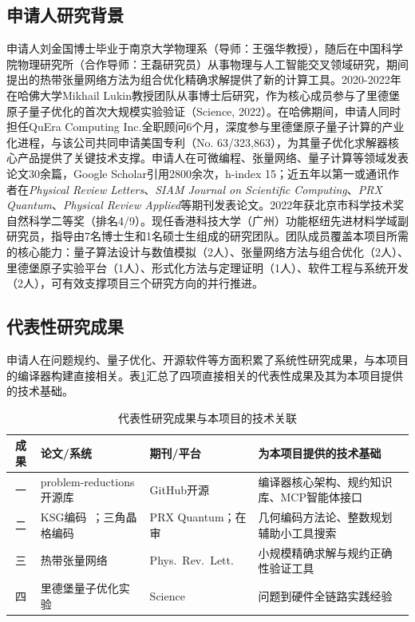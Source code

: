 
\subsection*{申请人研究背景}

申请人刘金国博士毕业于南京大学物理系（导师：王强华教授），随后在中国科学院物理研究所（合作导师：王磊研究员）从事物理与人工智能交叉领域研究，期间提出的热带张量网络方法为组合优化精确求解提供了新的计算工具。2020-2022年在哈佛大学Mikhail Lukin教授团队从事博士后研究，作为核心成员参与了里德堡原子量子优化的首次大规模实验验证（Science, 2022）。在哈佛期间，申请人同时担任QuEra Computing Inc.全职顾问6个月，深度参与里德堡原子量子计算的产业化进程，与该公司共同申请美国专利（No. 63/323,863），为其量子优化求解器核心产品提供了关键技术支撑。申请人在可微编程、张量网络、量子计算等领域发表论文30余篇，Google Scholar引用2800余次，h-index 15；近五年以第一或通讯作者在\emph{Physical Review Letters}、\emph{SIAM Journal on Scientific Computing}、\emph{PRX Quantum}、\emph{Physical Review Applied}等期刊发表论文。2022年获北京市科学技术奖自然科学二等奖（排名4/9）。现任香港科技大学（广州）功能枢纽先进材料学域副研究员，指导由7名博士生和1名硕士生组成的研究团队。团队成员覆盖本项目所需的核心能力：量子算法设计与数值模拟（2人）、张量网络方法与组合优化（2人）、里德堡原子实验平台（1人）、形式化方法与定理证明（1人）、软件工程与系统开发（2人），可有效支撑项目三个研究方向的并行推进。

\subsection*{代表性研究成果}

申请人在问题规约、量子优化、开源软件等方面积累了系统性研究成果，与本项目的编译器构建直接相关。表\ref{tab:prior-work}汇总了四项直接相关的代表性成果及其为本项目提供的技术基础。

\begin{table}[htbp]
\centering
\small
\caption{代表性研究成果与本项目的技术关联}
\label{tab:prior-work}
\renewcommand{\arraystretch}{1.4}
\begin{tabular}{|c|p{4.5cm}|p{3cm}|p{4.5cm}|}
\hline
\textbf{成果} & \textbf{论文/系统} & \textbf{期刊/平台} & \textbf{为本项目提供的技术基础} \\
\hline
一 & problem-reductions开源库~\cite{ProblemReductions2025} & GitHub开源 & 编译器核心架构、规约知识库、MCP智能体接口 \\
\hline
二 & KSG编码~\cite{Nguyen2023PRXQuantum}；三角晶格编码~\cite{Pan2025Triangular} & PRX Quantum；在审 & 几何编码方法论、整数规划辅助小工具搜索 \\
\hline
三 & 热带张量网络~\cite{Liu2021PRL} & Phys.\ Rev.\ Lett. & 小规模精确求解与规约正确性验证工具 \\
\hline
四 & 里德堡量子优化实验~\cite{Ebadi2022Science} & Science & 问题到硬件全链路实践经验 \\
\hline
\end{tabular}
\renewcommand{\arraystretch}{1.0}
\end{table}

